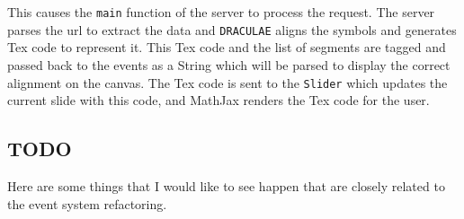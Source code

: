 \documentclass[letterpaper]{article}
\begin{document}
This causes the \verb+main+ function of the server to process the request. The server parses
the url to extract the data and \verb+DRACULAE+ aligns the symbols and generates Tex code to
represent it. This Tex code and the list of segments are tagged and passed back to the events
as a String which will be parsed to display the correct alignment on the canvas. The Tex code
is sent to the \verb+Slider+ which updates the current slide with this code, and MathJax renders
the Tex code for the user.

\subsection*{TODO}
Here are some things that I would like to see happen that are closely related to
the event system refactoring.
\end{document}
